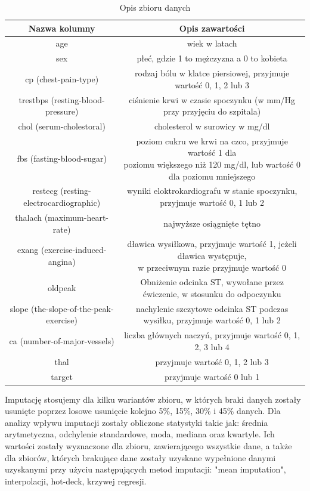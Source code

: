 \documentclass{classrep}
\begin{document}
{        \begin{table}
            \centering
            \begin{tabular}{|c|c|}
                \hline
                Nazwa kolumny & Opis zawartości \\ \hline
                age & wiek w latach   \\ \hline
                sex & płeć, gdzie 1 to mężczyzna a 0 to kobieta  \\ \hline
                cp (chest-pain-type) & rodzaj bólu w klatce piersiowej, przyjmuje wartość 0, 1, 2 lub 3  \\ \hline
                trestbps (resting-blood-pressure) & ciśnienie krwi w czasie spoczynku (w mm/Hg przy przyjęciu do szpitala) \\ \hline
                chol (serum-cholestoral) & cholesterol w surowicy w mg/dl  \\ \hline
                fbs (fasting-blood-sugar) & \makecell{poziom cukru we krwi na czco, przyjmuje wartość 1 dla \\ poziomu większego niż 120 mg/dl, lub wartość 0 dla poziomu mniejszego}  \\ \hline
                restecg (resting-electrocardiographic) & wyniki eloktrokardiografu w stanie spoczynku, przyjmuje wartość 0, 1 lub 2   \\ \hline
                thalach (maximum-heart-rate) & najwyższe osiągnięte tętno   \\ \hline
                exang (exercise-induced-angina) & \makecell{dławica wysiłkowa, przyjmuje wartość 1, jeżeli dławica występuje, \\ w przeciwnym razie przyjmuje wartość 0}   \\ \hline
                oldpeak & Obniżenie odcinka ST, wywołane przez ćwiczenie, w stosunku do odpoczynku   \\ \hline
                slope (the-slope-of-the-peak-exercise) & nachylenie szczytowe odcinka ST podczas wysiłku, przyjmuje wartość 0, 1 lub 2  \\ \hline
                ca (number-of-major-vessels) & liczba głównych naczyń, przyjmuje wartość 0, 1, 2, 3 lub 4  \\ \hline
                thal & przyjmuje wartość 0, 1, 2 lub 3   \\ \hline
                target & przyjmuje wartość 0 lub 1 \\ \hline
            \end{tabular}
            \caption{Opis zbioru danych}
            \label{opis-zbioru-danych}
        \end{table}
        \FloatBarrier
        Imputację stosujemy dla kilku wariantów zbioru, w których braki danych zostały usunięte poprzez losowe usunięcie kolejno 5\%, 15\%, 30\% i 45\% danych. Dla analizy wpływu imputacji zostały obliczone statystyki takie jak: średnia arytmetyczna, odchylenie standardowe, moda, mediana oraz kwartyle. Ich wartości zostały wyznaczone dla zbioru, zawierającego wszystkie dane, a także dla zbiorów, których brakujące dane zostały uzyskane wypełnione danymi uzyskanymi przy użyciu następujących metod imputacji: "mean imputation", interpolacji, hot-deck, krzywej regresji.

}
\end{document}

